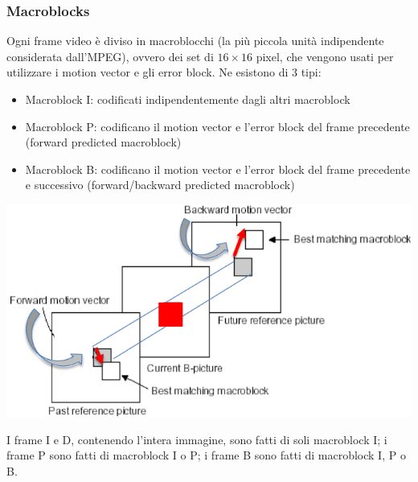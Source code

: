 \documentclass[a4paper,11pt]{article} %
\begin{document}
\subsubsection{Macroblocks}
Ogni frame video è diviso in macroblocchi (la più piccola unità indipendente considerata dall'MPEG), ovvero dei set di $16\times16$ pixel, che vengono usati per utilizzare i motion vector e gli error block. Ne esistono di 3 tipi:

\vspace{0.5em}
\noindent

\begin{minipage}{0.6\textwidth}
\begin{itemize}
\item Macroblock I: codificati indipendentemente dagli altri macroblock
\item Macroblock P: codificano il motion vector e l'error block del frame precedente (forward predicted macroblock)
\item Macroblock B: codificano il motion vector e l'error block del frame precedente e successivo (forward/backward predicted macroblock)
\end{itemize}
\end{minipage}
\hspace{0.05\textwidth} %
\begin{minipage}{0.4\textwidth}
\centering
    \includegraphics[width=0.9\linewidth]{Macroblocks.png}
\end{minipage}

\vspace{0.5em} 

I frame I e D, contenendo l'intera immagine, sono fatti di soli macroblock I; i frame P sono fatti di macroblock I o P; i frame B sono fatti di macroblock I, P o B.
\end{document}
